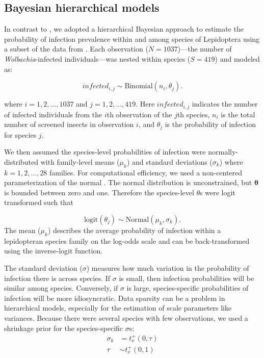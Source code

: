 \documentclass{frontiersSCNS}
\begin{document}
\subsection{Bayesian hierarchical models}
	In contrast to \cite{Ahmed:2015aa}, we adopted a hierarchical Bayesian approach to estimate the probability of infection prevalence within and among species of Lepidoptera using a subset of the data from \cite{Weinert:2015aa}. Each observation ($N=1037$)---the number of \emph{Wolbachia}-infected individuals---was nested within species ($S=419$) and  modeled as:

\begin{equation}
	infected_{i,j} \sim \mathrm{Binomial}(n_{i}, \theta_{j}).
\end{equation}

where $i = 1, 2, \ldots, 1037$ and $j = 1, 2, \ldots, 419$. Here $infected_{i,j}$ indicates the number of infected individuals from the $i$th observation of the $j$th species,  $n_{i}$ is the total number of screened insects in observation $i$, and $\theta_{j}$ is the probability of infection for species $j$. 

	We then assumed the species-level probabilities of infection were normally-distributed with family-level means ($\mu_{k}$) and standard deviations ($\sigma_{k}$) where $k = 1, 2, \ldots, 28$ families. For computational efficiency, we used a non-centered parameterization of the normal \citep{Papaspiliopoulos:2007aa}. The normal distribution is unconstrained, but $\mathbf{\theta}$ is bounded between zero and one. Therefore the species-level $\theta$s were logit transformed such that  

	\begin{equation}    
		\mathrm{logit} (\theta_{j}) \sim \mathrm{Normal}(\mu_{k}, \sigma_{k}).
	\end{equation}
The mean ($\mu_{k}$) describes the average probability of infection within a lepidopteran species family on the log-odds scale and can be back-transformed using the inverse-logit function. 

The standard deviation ($\sigma$) measures how much variation in the probability of infection there is across species. If $\sigma$ is small, then infection probabilities will be similar among species. Conversely, if $\sigma$ is large, species-specific probabilities of infection will be more idiosyncratic. Data sparsity can be a problem in hierarchical models, especially for the estimation of scale parameters like variances. Because there were several species with few observations, we used a shrinkage prior \citep{Carvalho:2009aa,Carvalho:2010aa}
for the species-specific $\sigma$s: 
	\begin{align}
		\sigma_{k} 	&= 	 	t_{\nu}^{+}(0,\tau) \nonumber \\
        \tau		&\sim	t_{\nu}^{+}(0,1)     
	\end{align}
\end{document}
